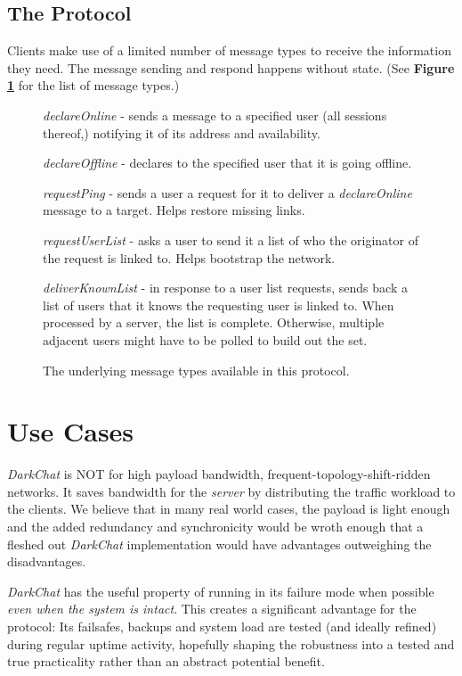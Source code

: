 \documentclass[11pt]{article}
\begin{document}
\subsection{The Protocol}

Clients make use of a limited number of message types to receive the information they need. The message sending and respond happens without state. (See {\bf Figure \ref{protocol}} for the list of message types.)

\begin{figure}
\caption{The underlying message types available in this protocol.}
\begin{description}
\item \emph{declareOnline} - sends a message to a specified user (all sessions thereof,) notifying it of its address and availability.
\item \emph{declareOffline} - declares to the specified user that it is going offline.
\item \emph{requestPing} - sends a user a request for it to deliver a \emph{declareOnline} message to a target. Helps restore missing links.
\item \emph{requestUserList} - asks a user to send it a list of who the originator of the request is linked to. Helps bootstrap the network.
\item \emph{deliverKnownList} - in response to a user list requests, sends back a list of users that it knows the requesting user is linked to. When processed by a server, the list is complete. Otherwise, multiple adjacent users might have to be polled to build out the set.
\end{description}
\label{protocol}
\end{figure}

\section{Use Cases}

\emph{DarkChat} is NOT for high payload bandwidth, frequent-topology-shift-ridden networks. It saves bandwidth for the \emph{server} by distributing the traffic workload to the clients. We believe that in many real world cases, the payload is light enough and the added redundancy and synchronicity would be wroth enough that a fleshed out \emph{DarkChat} implementation would have advantages outweighing the disadvantages.

\emph{DarkChat} has the useful property of running in its failure mode when possible \emph{even when the system is intact}. This creates a significant advantage for the protocol: Its failsafes, backups and system load are tested (and ideally refined) during regular uptime activity, hopefully shaping the robustness into a tested and true practicality rather than an abstract potential benefit.
\end{document}
